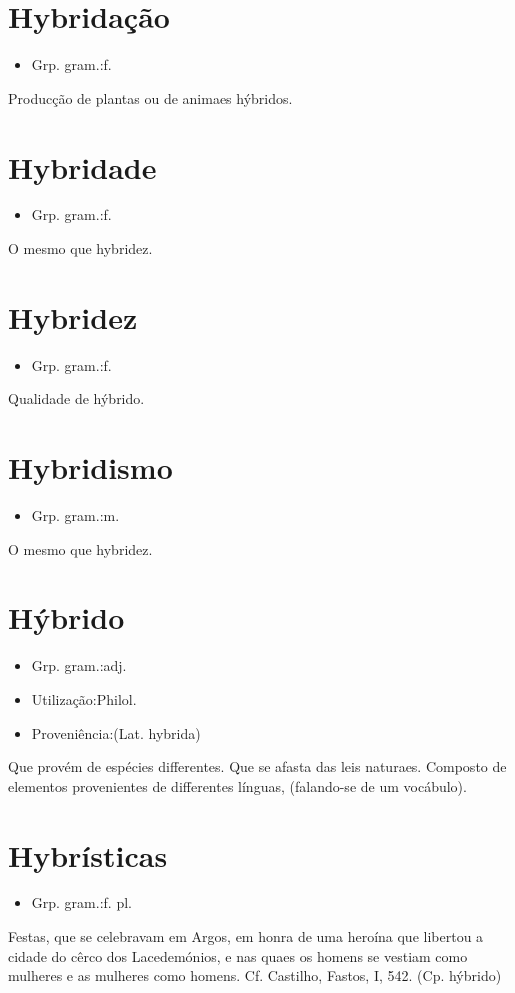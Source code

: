 \documentclass{article}
\begin{document}
\section{Hybridação}
\begin{itemize}
\item {Grp. gram.:f.}
\end{itemize}
Producção de plantas ou de animaes hýbridos.
\section{Hybridade}
\begin{itemize}
\item {Grp. gram.:f.}
\end{itemize}
O mesmo que \textunderscore hybridez\textunderscore .
\section{Hybridez}
\begin{itemize}
\item {Grp. gram.:f.}
\end{itemize}
Qualidade de hýbrido.
\section{Hybridismo}
\begin{itemize}
\item {Grp. gram.:m.}
\end{itemize}
O mesmo que \textunderscore hybridez\textunderscore .
\section{Hýbrido}
\begin{itemize}
\item {Grp. gram.:adj.}
\end{itemize}
\begin{itemize}
\item {Utilização:Philol.}
\end{itemize}
\begin{itemize}
\item {Proveniência:(Lat. \textunderscore hybrida\textunderscore )}
\end{itemize}
Que provém de espécies differentes.
Que se afasta das leis naturaes.
Composto de elementos provenientes de differentes línguas, (falando-se de um vocábulo).
\section{Hybrísticas}
\begin{itemize}
\item {Grp. gram.:f. pl.}
\end{itemize}
Festas, que se celebravam em Argos, em honra de uma heroína que libertou a cidade do cêrco dos Lacedemónios, e nas quaes os homens se vestiam como mulheres e as mulheres como homens. Cf. Castilho, \textunderscore Fastos\textunderscore , I, 542.
(Cp. \textunderscore hýbrido\textunderscore )
\end{document}
